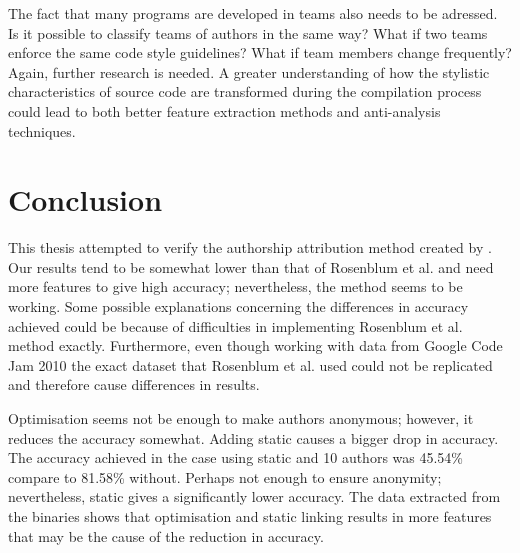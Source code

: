 \documentclass[a4paper,11pt]{kth-mag}
\begin{document}
The fact that many programs are developed in teams also needs to be adressed.
Is it possible to classify teams of authors in the same way? What if two teams
enforce the same code style guidelines? What if team members change frequently? 
Again, further research is needed. A greater understanding of how the stylistic
characteristics of source code are transformed during the compilation process
could lead to both better feature extraction methods and anti-analysis
techniques.

\chapter{Conclusion}
This thesis attempted to verify the authorship attribution method created by
\parencite{rosenblum2011wrote}. Our results tend to be somewhat lower than that
of Rosenblum et al. and need more features to give high accuracy; nevertheless,
the method seems to be working. Some possible explanations concerning the
differences in accuracy achieved could be because of difficulties in
implementing Rosenblum et al. method exactly. Furthermore, even though working
with data from Google Code Jam 2010 the exact dataset that Rosenblum et al.
used could not be replicated and therefore cause differences in results. 

Optimisation seems not be enough to make authors anonymous; however, it reduces
the accuracy somewhat. Adding static causes a bigger drop in accuracy. The
accuracy achieved in the case using static and 10 authors was 45.54\% compare
to 81.58\% without. Perhaps not enough to ensure anonymity; nevertheless,
static gives a significantly lower accuracy. The data extracted from the binaries shows that
optimisation and static linking results in more features that may be the cause
of the reduction in accuracy.

\printbibliography
\end{document}
